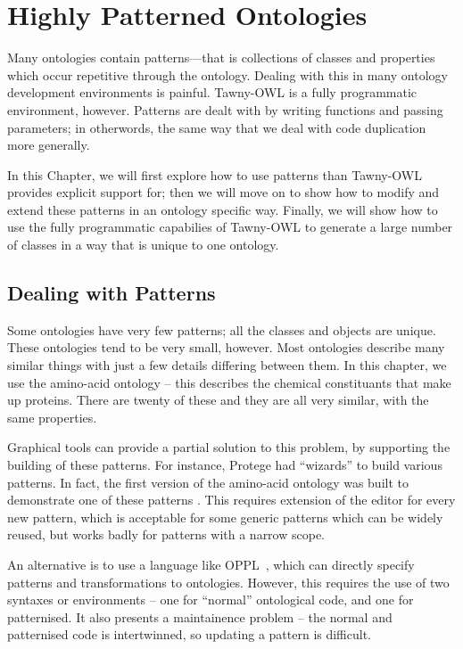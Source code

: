 \chapter{Highly Patterned Ontologies}
\label{cha:highly-patt-ontol}

Many ontologies contain patterns---that is collections of classes and
properties which occur repetitive through the ontology. Dealing with this in
many ontology development environments is painful. Tawny-OWL is a fully
programmatic environment, however. Patterns are dealt with by writing
functions and passing parameters; in otherwords, the same way that we deal
with code duplication more generally.

In this Chapter, we will first explore how to use patterns than
Tawny-OWL provides explicit support for; then we will move on to show
how to modify and extend these patterns in an ontology specific
way. Finally, we will show how to use the fully programmatic
capabilies of Tawny-OWL to generate a large number of classes in a way
that is unique to one ontology.

\section{Dealing with Patterns}
\label{sec:deal-with-patt}

Some ontologies have very few patterns; all the classes and objects are
unique. These ontologies tend to be very small, however. Most ontologies
describe many similar things with just a few details differing between them.
In this chapter, we use the amino-acid ontology -- this describes the chemical
constituants that make up proteins. There are twenty of these and they are all
very similar, with the same properties.

Graphical tools can provide a partial solution to this problem, by supporting
the building of these patterns. For instance, Protege had ``wizards'' to build
various patterns. In fact, the first version of the amino-acid ontology was
built to demonstrate one of these patterns \cite{todo}. This requires
extension of the editor for every new pattern, which is acceptable for some
generic patterns which can be widely reused, but works badly for patterns with
a narrow scope.

An alternative is to use a language like
OPPL~\cite{aranguren_Stevens_Antezana_2009}, which can directly specify
patterns and transformations to ontologies. However, this requires the use of
two syntaxes or environments -- one for ``normal'' ontological code, and one
for patternised. It also presents a maintainence problem -- the normal and
patternised code is intertwinned, so updating a pattern is difficult.

